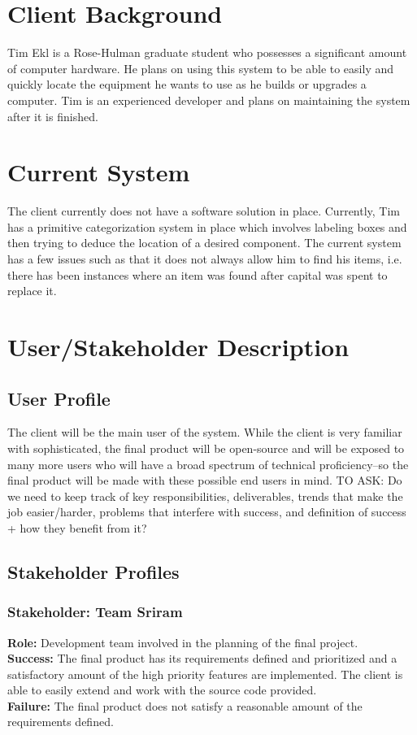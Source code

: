 \documentclass{article}
\begin{document}
\section{Client Background}
Tim Ekl is a Rose-Hulman graduate student who possesses a significant amount of computer hardware.  He plans on using this system to be able to easily and quickly locate the equipment he wants to use as he builds or upgrades a computer.  Tim is an experienced developer and plans on maintaining the system after it is finished.  

\section{Current System}
The client currently does not have a software solution in place.  Currently, Tim has a primitive categorization system in place which involves labeling boxes and then trying to deduce the location of a desired component.  The current system has a few issues such as that it does not always allow him to find his items, i.e. there has been instances where an item was found after capital was spent to replace it.

\section{User/Stakeholder Description}

\subsection{User Profile}
The client will be the main user of the system.  While the client is very familiar with sophisticated, the final product will be open-source and will be exposed to many more users who will have a broad spectrum of technical proficiency--so the final product will be made with these possible end users in mind.
TO ASK: Do we need to keep track of key responsibilities, deliverables, trends that make the job easier/harder, problems that interfere with success, and definition of success + how they benefit from it?

\subsection{Stakeholder Profiles}

\subsubsection{Stakeholder: Team Sriram}
\textbf{Role:} Development team involved in the planning of the final project.\\
\textbf{Success:} The final product has its requirements defined and prioritized and a satisfactory amount of the high priority features are implemented.  The client is able to easily extend and work with the source code provided.\\
\textbf{Failure:} The final product does not satisfy a reasonable amount of the requirements defined.
\end{document}
